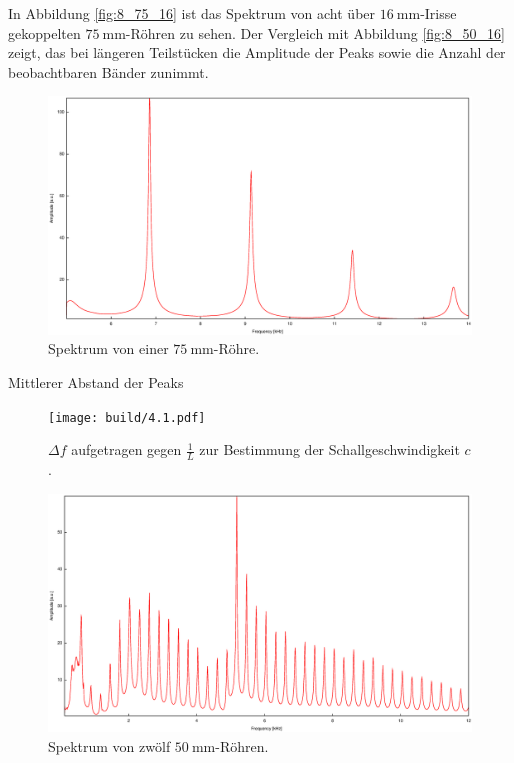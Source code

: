 In Abbildung \ref{fig:8_75_16} ist das Spektrum von acht über $\SI{16}{\milli\meter}$-Irisse gekoppelten $\SI{75}{\milli\meter}$-Röhren zu sehen. Der Vergleich mit Abbildung \ref{fig:8_50_16} zeigt, das bei längeren Teilstücken die Amplitude der Peaks sowie die Anzahl der beobachtbaren Bänder zunimmt.\\
\begin{figure}
\centering
\includegraphics[width=\linewidth-60pt,height=\textheight-60pt,keepaspectratio]{FP-V23data/4.1_75mm.eps}
\caption{Spektrum von einer $\SI{75}{\milli\meter}$-Röhre.}
\label{fig:Spek4_1}
\end{figure}
\begin{table}
\centering
\caption{Mittlerer Abstand der Peaks}

\end{table}
\begin{figure}
\centering
\texttt{[image: build/4.1.pdf]}
\caption{$\Delta f$ aufgetragen gegen $\frac{1}{L}$ zur Bestimmung der Schallgeschwindigkeit $c$.}
\label{fig:Df_L}
\end{figure}
\begin{figure}
\centering
\includegraphics[width=\linewidth-60pt,height=\textheight-60pt,keepaspectratio]{FP-V23data/4.2_600mm.eps}
\caption{Spektrum von zwölf $\SI{50}{\milli\meter}$-Röhren.}
\label{fig:12_50}
\end{figure}
